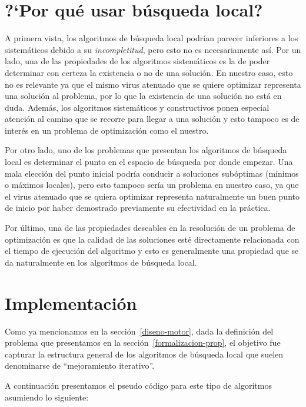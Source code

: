 \section{?`Por qu\'e usar b\'usqueda local?}

A primera vista, los algoritmos de b\'usqueda local podr\'ian parecer inferiores
a los sistem\'aticos debido a su \textit{incompletitud}, pero esto no es
necesariamente as\'i. Por un lado, una de las propiedades de los algoritmos
sistem\'aticos es la de poder determinar con certeza la existencia o no de una
soluci\'on. En nuestro caso, esto no es relevante ya que el mismo virus atenuado
que se quiere optimizar representa una soluci\'on al problema, por lo que la
existencia de una soluci\'on no est\'a en duda. Adem\'as, los algoritmos
sistem\'aticos y constructivos ponen especial atenci\'on al camino que se
recorre para llegar a una soluci\'on y esto tampoco es de inter\'es en un
problema de optimizaci\'on como el nuestro.

Por otro lado, uno de los problemas que presentan los algoritmos de b\'usqueda
local es determinar el punto en el espacio de b\'usqueda por donde empezar. Una
mala elecci\'on del punto inicial podr\'ia conducir a soluciones sub\'optimas
(m\'inimos o m\'aximos locales), pero esto tampoco ser\'ia un problema en
nuestro caso, ya que el virus atenuado que se quiera optimizar representa
naturalmente un buen punto de inicio por haber demostrado previamente su
efectividad en la pr\'actica.

Por \'ultimo, una de las propiedades deseables en la resoluci\'on de un
problema de optimizaci\'on es que la calidad de las soluciones est\'e
directamente relacionada con el tiempo de ejecuci\'on del algoritmo y esto es
generalmente una propiedad que se da naturalmente en los algoritmos de
b\'usqueda local.

\section{Implementaci\'on}

Como ya mencionamos en la secci\'on~\ref{diseno-motor}, dada la definici\'on
del problema que presentamos en la secci\'on~\ref{formalizacion-prop}, el
objetivo fue capturar la estructura general de los algoritmos de
b\'usqueda local que suelen denominarse de ``mejoramiento iterativo''.

A continuaci\'on presentamos el pseudo c\'odigo para este tipo de algoritmos
asumiendo lo siguiente:

